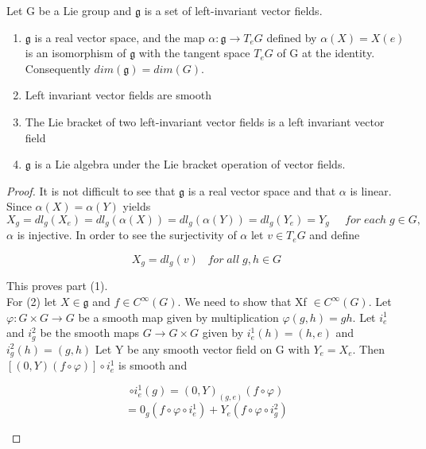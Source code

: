 \begin{proposition}\label{Prop1}
 Let G be a Lie group and $\mathfrak{g}$ is a set of left-invariant vector fields. 
 \begin{enumerate}
  \item $\mathfrak{g}$ is a real vector space, and the map $\alpha: \mathfrak{g} \rightarrow T_{e}G$ defined by $\alpha(X) = X(e)$
  is an isomorphism of $\mathfrak{g}$ with the tangent space $T_{e}G$ of G at the identity. Consequently $dim(\mathfrak{g}) = 
  dim(G)$.
  \item Left invariant vector fields are smooth
  \item The Lie bracket of two left-invariant vector fields is a left invariant vector field
  \item $\mathfrak{g}$ is a Lie algebra under the Lie bracket operation of vector fields.
 \end{enumerate}
\begin{proof}
 It is not difficult to see that $\mathfrak{g}$ is a real vector space and that $\alpha$ is linear. Since 
 $\alpha(X) = \alpha(Y)$ yields 
 \begin{equation*}
  X_{g} = dl_g(X_e) = dl_g(\alpha(X)) = dl_g(\alpha(Y)) = dl_g(Y_e) = Y_g \;\;\;\;\;for\;each\;g\in G,
 \end{equation*}
$\alpha$ is injective. In order to see the surjectivity of $\alpha$ let $v \in T_e G$ and define 
\begin{center}
 \begin{equation*}
  X_g = dl_g(v) \;\;\;for\;all\; g,h \in G
 \end{equation*}
 \end{center}
This proves part (1). 
   \\ For (2) let $X \in \mathfrak{g}$ and $f \in C^{\infty}(G)$. We need to show that Xf $\in C^{\infty}(G)$. 
  Let $\varphi: G \times G \rightarrow G$ be a smooth map given by multiplication $\varphi(g,h) = gh$. Let $i^{1}_{e}$ and
  $i^{2}_{g}$ be the smooth maps $G \rightarrow G \times G$ given by $i^{1}_{e}(h) = (h,e)$ and $i^{2}_{g}(h) = (g,h)$
 Let Y be any smooth vector field on G with $Y_e = X_e$. Then $[(0,Y)(f\circ \varphi)]\circ i^{1}_e$ is smooth and 
\begin{center}
 \begin{equation*}
  [(0,Y)(f\circ \varphi)]\circ i^{1}_e(g) = (0,Y)_{(g,e)}(f\circ \varphi)
\end{equation*}\begin{equation*} = 0_{g}(f\circ \varphi \circ i^{1}_{e}) + Y_{e}(f\circ \varphi \circ i^{2}_{g})\end{equation*}

\end{center}
\end{proof}
\end{proposition}
